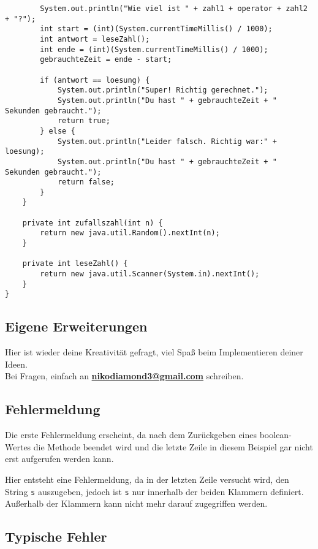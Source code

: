 \documentclass{scrartcl}   %
\begin{document}
\begin{lstlisting}
        System.out.println("Wie viel ist " + zahl1 + operator + zahl2 + "?");
        int start = (int)(System.currentTimeMillis() / 1000);
        int antwort = leseZahl();
        int ende = (int)(System.currentTimeMillis() / 1000);
        gebrauchteZeit = ende - start;
        
        if (antwort == loesung) {
            System.out.println("Super! Richtig gerechnet.");
            System.out.println("Du hast " + gebrauchteZeit + " Sekunden gebraucht.");
            return true;
        } else {
            System.out.println("Leider falsch. Richtig war:" + loesung);
            System.out.println("Du hast " + gebrauchteZeit + " Sekunden gebraucht.");
            return false;
        }
    }

    private int zufallszahl(int n) {
        return new java.util.Random().nextInt(n);
    }

    private int leseZahl() {
        return new java.util.Scanner(System.in).nextInt();
    }
}
\end{lstlisting}

\subsection{Eigene Erweiterungen}

Hier ist wieder deine Kreativität gefragt, viel Spaß beim Implementieren deiner Ideen.\\
Bei Fragen, einfach an \textbf{\href{mailto:nikodiamond3@gmail.com}{nikodiamond3@gmail.com}} schreiben.

\subsection{Fehlermeldung}

\begin{itemize}
    \barrow Die erste Fehlermeldung erscheint, da nach dem Zurückgeben eines boolean-Wertes die Methode beendet wird und die letzte Zeile in diesem Beispiel gar nicht erst aufgerufen werden kann.
    
    \newpage
    
    \barrow Hier entsteht eine Fehlermeldung, da in der letzten Zeile versucht wird, den String \texttt{s} auszugeben, jedoch ist \texttt{s} nur innerhalb der beiden Klammern definiert. Außerhalb der Klammern kann nicht mehr darauf zugegriffen werden.
\end{itemize}

\subsection{Typische Fehler}
\end{document}
